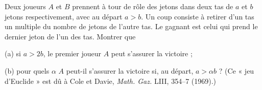 Deux joueurs $A$ et $B$ prennent à tour de rôle des jetons dans deux tas de $a$ et $b$ jetons respectivement, avec au départ $a > b$. Un coup consiste à retirer d'un tas un multiple du nombre de jetons de l'autre tas. Le gagnant est celui qui prend le dernier jeton de l'un des tas. Montrer que

(a) si $a > 2b$, le premier joueur $A$ peut s'assurer la victoire ;

(b) pour quels $\alpha$ $A$ peut-il s'assurer la victoire si, au départ, $a > \alpha b$ ? (Ce « jeu d'Euclide » est dû à Cole et Davie, \emph{Math. Gaz.} LIII, 354--7 (1969).)
